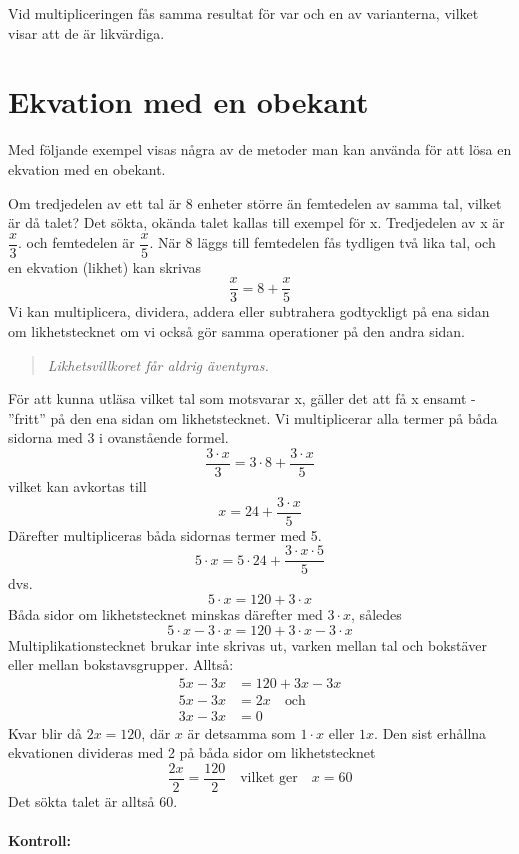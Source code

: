Vid multipliceringen fås samma resultat för var och en av varianterna, vilket
visar att de är likvärdiga.

\section{Ekvation med en obekant}

Med följande exempel visas några av de metoder man kan använda för att lösa en
ekvation med en obekant.

Om tredjedelen av ett tal är 8 enheter större än femtedelen av samma tal, vilket
är då talet?
Det sökta, okända talet kallas till exempel för x.
Tredjedelen av x är \(\dfrac{x}{3}\). och femtedelen är \(\dfrac{x}{5}\).
När 8 läggs till femtedelen fås tydligen två lika tal, och en ekvation (likhet)
kan skrivas
\[\dfrac{x}{3}=8 + \dfrac{x}{5}\]
Vi kan multiplicera, dividera, addera eller subtrahera godtyckligt på ena sidan
om likhetstecknet om vi också gör samma operationer på den andra sidan.

\begin{quote}\emph{
Likhetsvillkoret får aldrig äventyras.
}\end{quote}

För att kunna utläsa vilket tal som motsvarar x, gäller det att få x ensamt -
''fritt'' på den ena sidan om likhetstecknet.
Vi multiplicerar alla termer på båda sidorna med 3 i ovanstående formel.
\[\frac{3 \cdot x}{3} = 3 \cdot 8 + \frac{3 \cdot x}{5}\]
vilket kan avkortas till
\[x = 24 + \frac{3 \cdot x}{5}\]
Därefter multipliceras båda sidornas termer med 5.
\[5 \cdot x = 5 \cdot 24 + \frac{3 \cdot x \cdot 5}{5}\]
dvs.
\[5 \cdot x = 120 + 3 \cdot x\]
Båda sidor om likhetstecknet minskas därefter med \(3 \cdot x\), således
\[5 \cdot x - 3 \cdot x = 120 + 3 \cdot x - 3 \cdot x\]
Multiplikationstecknet brukar inte skrivas ut, varken mellan tal och bokstäver
eller mellan bokstavsgrupper.
Alltså:
\begin{align*}
5x - 3x &= 120 + 3x - 3x \\
5x - 3x &= 2x \quad \text{och} \\
3x - 3x &= 0
\end{align*}
Kvar blir då \(2x = 120\), där \(x\) är detsamma som \(1 \cdot x\) eller \(1x\).
Den sist erhållna ekvationen divideras med 2 på båda sidor om likhetstecknet
\[
\frac{2x}{2} = \frac{120}{2}
\quad \text{vilket ger} \quad
x = 60
\]
Det sökta talet är alltså 60.

\paragraph{Kontroll:}

